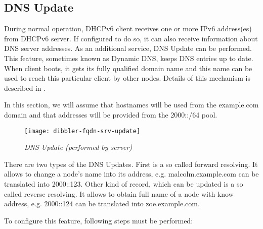 \subsection{DNS Update}
\label{feature-dns-update}
During normal operation, DHCPv6 client receives one or more IPv6
address(es) from DHCPv6 server. If configured to do so, it can also
receive information about DNS server addresses. As an additional
service, DNS Update can be performed. This feature, sometimes known as
Dynamic DNS, keeps DNS entries up to date. When client boots, it gets
its fully qualified domain name and this name can be used to reach
this particular client by other nodes. Details of this mechanism is
described in \cite{rfc4704}.

\Note In this section, we will assume that hostnames will be used from
the example.com domain and that addresses will be provided from the
2000::/64 pool.

\begin{figure}[ht]
\begin{center}
\texttt{[image: dibbler-fqdn-srv-update]}
\caption{\emph{DNS Update (performed by server)}}
\end{center}
\end{figure}

There are two types of the DNS Updates. First is a so called forward
resolving. It allows to change a node's name into its address,
e.g. malcolm.example.com can be translated into 2000::123. Other kind
of record, which can be updated is a so called reverse resolving. It
allows to obtain full name of a node with know address, e.g. 2000::124
can be translated into zoe.example.com.

To configure this feature, following steps must be performed:

